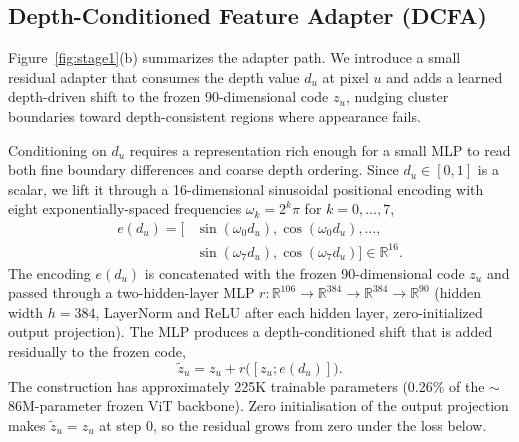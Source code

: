 \documentclass{article}
\begin{document}
\subsection{Depth-Conditioned Feature Adapter (DCFA)}
\label{sec:method:dcfa}

Figure~\ref{fig:stage1}(b) summarizes the adapter path. We introduce a small residual adapter that consumes the depth value $d_u$ at pixel $u$ and adds a learned depth-driven shift to the frozen 90-dimensional code $z_u$, nudging cluster boundaries toward depth-consistent regions where appearance fails.

Conditioning on $d_u$ requires a representation rich enough for a small MLP to read both fine boundary differences and coarse depth ordering. Since $d_u \in [0, 1]$ is a scalar, we lift it through a 16-dimensional sinusoidal positional encoding with eight exponentially-spaced frequencies $\omega_k = 2^k \pi$ for $k = 0, \dots, 7$,
\begin{equation}
\begin{aligned}
e(d_u) = \big[ &\sin(\omega_0 d_u), \cos(\omega_0 d_u), \dots, \\
              &\sin(\omega_7 d_u), \cos(\omega_7 d_u) \big] \in \mathbb{R}^{16}.
\end{aligned}
\label{eq:sinusoid}
\end{equation}
The encoding $e(d_u)$ is concatenated with the frozen 90-dimensional code $z_u$ and passed through a two-hidden-layer MLP $r: \mathbb{R}^{106} \to \mathbb{R}^{384} \to \mathbb{R}^{384} \to \mathbb{R}^{90}$ (hidden width $h = 384$, LayerNorm and ReLU after each hidden layer, zero-initialized output projection). The MLP produces a depth-conditioned shift that is added residually to the frozen code,
\begin{equation}
\tilde z_u = z_u + r\big([z_u; e(d_u)]\big).
\label{eq:residual}
\end{equation}
The construction has approximately 225K trainable parameters (0.26\% of the $\sim$86M-parameter frozen ViT backbone). Zero initialisation of the output projection makes $\tilde z_u = z_u$ at step 0, so the residual grows from zero under the loss below.
\end{document}
